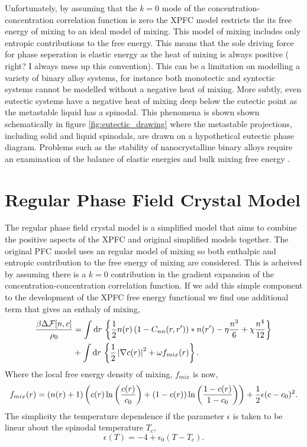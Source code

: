 Unfortunately, by assuming that the $k=0$ mode of the
concentration-concentration correlation function is zero the XPFC model
restricts the its free energy of mixing to an ideal model of mixing. This model
of mixing includes only entropic contributions to the free energy. This means
that the sole driving force for phase seperation is elastic energy as the heat
of mixing is always positive ( {\color{ForestGreen} right? I always mess up
this convention}). This can be a limitation on modelling a variety of binary
alloy systems, for instance both monotectic and syntectic systems cannot be
modelled without a negative heat of mixing. More subtly, even eutectic systems
have a negative heat of mixing deep below the eutectic point as the metastable
liquid has a spinodal. This phenomena is shown shown schematically in figure
\ref{fig:eutectic_drawing} where the metastable projections, including solid
and liquid spinodals, are drawn on a hypothetical eutectic phase diagram.
Problems such as the stability of nanocrystalline binary alloys require an
examination of the balance of elastic energies and bulk mixing free energy
\cite{MURDOCH13}.

\section{Regular Phase Field Crystal Model} %

The regular phase field crystal model is a simplified model that aims to combine 
the positive aspects of the XPFC and original simplified models together. The 
original PFC model uses an regular model of mixing so both enthalpic and entropic 
contribution to the free energy of mixing are considered. This is acheived by
assuming there is a $k=0$ contribution in the gradient expansion of the 
concentration-concentration correlation function. If we add this simple component
to the development of the XPFC free energy functional we find one additional term
that gives an enthaly of mixing,
%
\begin{align}
    \frac{\beta\Delta\mathcal{F}[n, c]}{\rho_0} &= \int \mathrm{d}r\, \left\lbrace
        \frac{1}{2} n(r) \left(1 - C_{nn}(r, r^\prime)\right) \ast n(r^\prime)
        - \eta \frac{n^3}{6} + \chi \frac{n^4}{12} \right\rbrace \\
        &+ \int \mathrm{d}r\,\left\lbrace
            \frac{1}{2}\left\vert \nabla c(r) \right\vert^2 + \omega f_{mix}(r)
            \right\rbrace. \nonumber
\end{align}
%
Where the local free energy density of mixing, $f_{mix}$ is now,
%
\begin{equation}
    f_{mix}(r) = \left(n(r) + 1\right)\left( 
            c(r)\ln\left(\frac{c(r)}{c_0}\right) + (1-c(r))\ln\left(\frac{1-c(r)}{1-c_0}\right) \right) + 
            \frac{1}{2} \epsilon (c - c_0)^2.
\end{equation}
%
The simplicity the temperature dependence if the parameter $\epsilon$ is taken to be
linear about the spinodal temperature $T_c$,
%
\begin{equation}
    \epsilon(T) = -4 + \epsilon_0(T - T_c).
\end{equation}

